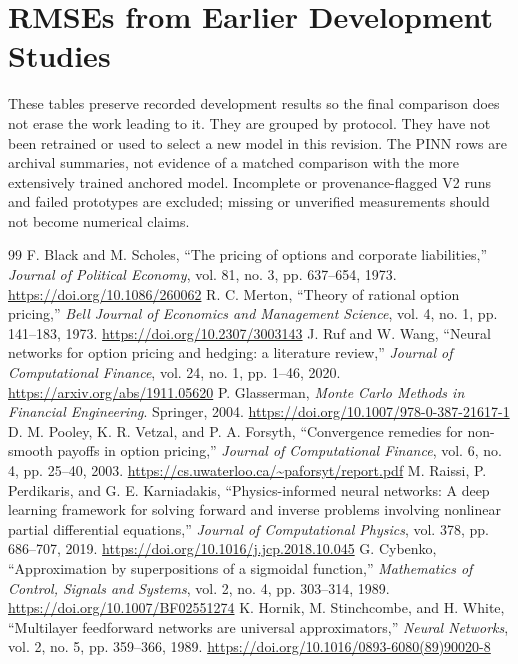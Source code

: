 \documentclass[11pt,a4paper]{article}
\begin{document}
\clearpage
\section{RMSEs from Earlier Development Studies}
\label{sec:historical-rmse}
These tables preserve recorded development results so the final comparison does not erase the work leading to it. They are grouped by protocol. They have not been retrained or used to select a new model in this revision. The PINN rows are archival summaries, not evidence of a matched comparison with the more extensively trained anchored model. Incomplete or provenance-flagged V2 runs and failed prototypes are excluded; missing or unverified measurements should not become numerical claims.


\clearpage
\small
\begin{thebibliography}{99}
 F. Black and M. Scholes, ``The pricing of options and corporate liabilities,'' \emph{Journal of Political Economy}, vol. 81, no. 3, pp. 637--654, 1973. \url{https://doi.org/10.1086/260062}
 R. C. Merton, ``Theory of rational option pricing,'' \emph{Bell Journal of Economics and Management Science}, vol. 4, no. 1, pp. 141--183, 1973. \url{https://doi.org/10.2307/3003143}
 J. Ruf and W. Wang, ``Neural networks for option pricing and hedging: a literature review,'' \emph{Journal of Computational Finance}, vol. 24, no. 1, pp. 1--46, 2020. \url{https://arxiv.org/abs/1911.05620}
 P. Glasserman, \emph{Monte Carlo Methods in Financial Engineering}. Springer, 2004. \url{https://doi.org/10.1007/978-0-387-21617-1}
 D. M. Pooley, K. R. Vetzal, and P. A. Forsyth, ``Convergence remedies for non-smooth payoffs in option pricing,'' \emph{Journal of Computational Finance}, vol. 6, no. 4, pp. 25--40, 2003. \url{https://cs.uwaterloo.ca/~paforsyt/report.pdf}
 M. Raissi, P. Perdikaris, and G. E. Karniadakis, ``Physics-informed neural networks: A deep learning framework for solving forward and inverse problems involving nonlinear partial differential equations,'' \emph{Journal of Computational Physics}, vol. 378, pp. 686--707, 2019. \url{https://doi.org/10.1016/j.jcp.2018.10.045}
 G. Cybenko, ``Approximation by superpositions of a sigmoidal function,'' \emph{Mathematics of Control, Signals and Systems}, vol. 2, no. 4, pp. 303--314, 1989. \url{https://doi.org/10.1007/BF02551274}
 K. Hornik, M. Stinchcombe, and H. White, ``Multilayer feedforward networks are universal approximators,'' \emph{Neural Networks}, vol. 2, no. 5, pp. 359--366, 1989. \url{https://doi.org/10.1016/0893-6080(89)90020-8}

\end{thebibliography}
\end{document}
